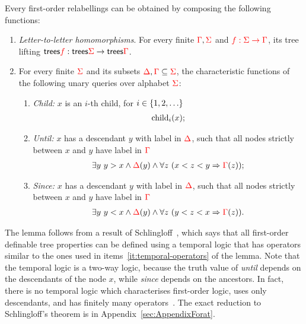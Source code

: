 \begin{lemma}\label{lem:schlingloff} Every first-order relabellings can be obtained by composing the following functions:
    \begin{enumerate}
        \item \label{it:relabelling} \emph{Letter-to-letter homomorphisms}. For  every finite ${\color{red}{\Gamma}},{\color{red}{\Sigma}}$ and ${\color{red}{f : {\color{red}{\Sigma}}\to {\color{red}{\Gamma}}}}$, its tree lifting $\mathsf {trees} {\color{red}{f}} : \mathsf {trees} {\color{red}{\Sigma}} \to \mathsf {trees} {\color{red}{\Gamma}}$.
        \item \label{it:temporal-operators} For every finite  ${\color{red}{\Sigma}}$ and its subsets ${\color{red}{\Delta}}, {\color{red}{\Gamma}} \subseteq {\color{red}{\Sigma}}$, the characteristic functions of the following unary queries over alphabet ${\color{red}{\Sigma}}$:
        \begin{enumerate}
            \item \label{it:child} \emph{Child:} $x$ is an $i$-th child, for $i \in \{1,2,\ldots\}$
            \begin{align*}
            \mathrm{child}_{i} (x); 
            \end{align*}
             \item \label{it:until} \emph{Until:}  $x$ has a descendant $y$ with label in ${\color{red}{\Delta}}$, such that all nodes strictly between $x$ and $y$ have label in ${\color{red}{\Gamma}}$
             \begin{align*} 
                  \exists y\ y > x \land {\color{red}{\Delta}}(y) \land  \forall z \ (x < z < y \Rightarrow {\color{red}{\Gamma}}(z));
             \end{align*} 
             \item \label{it:since}\emph{Since:} $x$ has a descendant $y$ with label in ${\color{red}{\Delta}}$, such that all nodes strictly between $x$ and $y$ have label in ${\color{red}{\Gamma}}$
             \begin{align*}
                  \exists y\ y < x \land {\color{red}{\Delta}}(y) \land  \forall z \ (y < z < x \Rightarrow {\color{red}{\Gamma}}(z)).
             \end{align*} 
        \end{enumerate}
    \end{enumerate}
    
\end{lemma}

The  lemma follows from a result of  Schlingloff~\cite[Theorem 2.6]{schlingloff1992expressive}, which says  that all first-order definable tree properties can be defined using a temporal logic that has operators similar to the ones used in items~\ref{it:temporal-operators} of the lemma. Note that the temporal logic is a two-way logic, because the truth value of \emph{until} depends on the descendants of the node $x$, while \emph{since} depends on the ancestors. In fact, there is no temporal logic which characterises first-order logic, uses only descendants, and has finitely many operators~\cite[Theorem 5.5]{bojanczykWreathProductsForest2012}. 
The exact reduction to Schlingloff's theorem is  in Appendix~\ref{sec:AppendixForat}.


